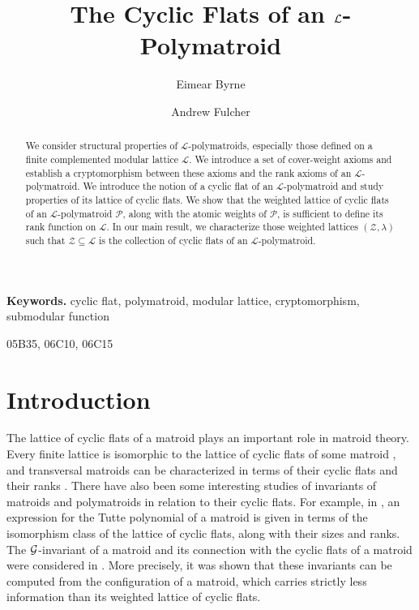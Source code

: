 \documentclass[a4paper,11pt,reqno]{article}
\title{The Cyclic Flats of an $\mL$-Polymatroid}
\author[1]{Eimear Byrne}
\affil[1,2]{School of Mathematics and Statistics, University College Dublin, Belfield, Ireland}
\author[2]{Andrew Fulcher}
\theoremstyle{definition}
\newcommand{\mL}{\mathcal{L}}
\newcommand{\mP}{\mathcal{P}}
\newcommand{\mZ}{\mathcal{Z}}
\providecommand{\keywords}[1]
{
\noindent\textbf{{\small \textbf{Keywords.}}} #1
}
\begin{document}
\maketitle

\begin{abstract}
   We consider structural properties of $\mL$-polymatroids, especially those defined on a finite complemented modular lattice $\mL$. We introduce a set of cover-weight axioms and establish a cryptomorphism between these axioms and the rank axioms of an $\mL$-polymatroid. We introduce the notion of a cyclic flat of an $\mL$-polymatroid and study properties of its lattice of cyclic flats. 
   We show that the weighted lattice of cyclic flats of an $\mL$-polymatroid 
   $\mP$, along with the atomic weights of $\mP$, is sufficient to define its rank function on $\mL$. In our main result, we characterize those weighted lattices $(\mZ,\lambda)$ such that $\mZ\subseteq\mathcal{L}$ is the collection of cyclic flats of an $\mL$-polymatroid.   
\end{abstract}

\keywords{cyclic flat, polymatroid, modular lattice, cryptomorphism, submodular function}

\smallskip
{} 05B35, 06C10, 06C15

\tableofcontents


\section{Introduction}
The lattice of cyclic flats of a matroid plays an important role in matroid theory. Every finite lattice is isomorphic to the lattice of cyclic flats of some matroid \cite{bonin_demier,sims}, and transversal matroids can be characterized in terms of their cyclic flats and their ranks \cite{bkdm,bryl_transv,ingleton,mason}. 
There have also been some interesting studies of invariants of matroids and polymatroids in relation to their cyclic flats. For example, in \cite{eberhardt}, an expression for the Tutte polynomial of a matroid is given in terms of the isomorphism class of the lattice of cyclic flats, along with their sizes and ranks. The ${\cal{G}}$-invariant of a matroid and its connection with the cyclic flats of a matroid were considered in \cite{bonin_Ginv,bonin_kung_Ginv}. More precisely, it was shown that these invariants can be computed from the configuration of a matroid, which carries strictly less information than its weighted lattice of cyclic flats.
\end{document}
